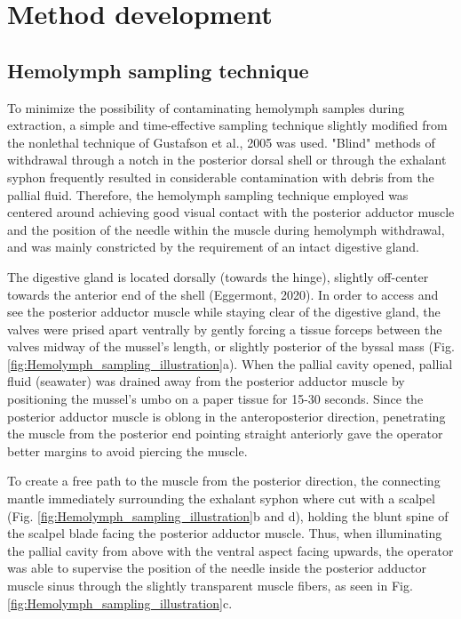 \chapter{Method development}
\label{chap:md}

\section{Hemolymph sampling technique}
To minimize the possibility of contaminating hemolymph samples during extraction, a simple and time-effective sampling technique slightly modified from the nonlethal technique of Gustafson et al., 2005 was used. "Blind" methods of withdrawal through a notch in the posterior dorsal shell or through the exhalant syphon frequently resulted in considerable contamination with debris from the pallial fluid. Therefore, the hemolymph sampling technique employed was centered around achieving good visual contact with the posterior adductor muscle and the position of the needle within the muscle during hemolymph withdrawal, and was mainly constricted by the requirement of an intact digestive gland.

The digestive gland is located dorsally (towards the hinge), slightly off-center towards the anterior end of the shell (Eggermont, 2020). In order to access and see the posterior adductor muscle while staying clear of the digestive gland, the valves were prised apart ventrally by gently forcing a tissue forceps between the valves midway of the mussel's length, or slightly posterior of the byssal mass (Fig. \ref{fig:Hemolymph_sampling_illustration}a). When the pallial cavity opened, pallial fluid (seawater) was drained away from the posterior adductor muscle by positioning the mussel's umbo on a paper tissue for 15-30 seconds. Since the posterior adductor muscle is oblong in the anteroposterior direction, penetrating the muscle from the posterior end pointing straight anteriorly gave the operator better margins to avoid piercing the muscle.

To create a free path to the muscle from the posterior direction, the connecting mantle immediately surrounding the exhalant syphon where cut with a scalpel (Fig. \ref{fig:Hemolymph_sampling_illustration}b and d), holding the blunt spine of the scalpel blade facing the posterior adductor muscle. Thus, when illuminating the pallial cavity from above with the ventral aspect facing upwards, the operator was able to supervise the position of the needle inside the posterior adductor muscle sinus through the slightly transparent muscle fibers, as seen in Fig. \ref{fig:Hemolymph_sampling_illustration}c.

